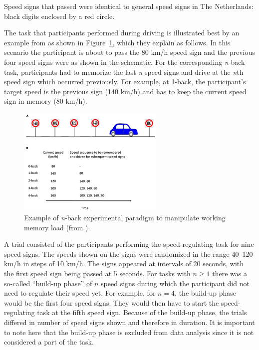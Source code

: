 Speed signs that passed were identical to general speed signs in The Netherlands: black digits enclosed by a red circle. 

The \nback task that participants performed during driving is illustrated best by an example from \citet{Unni2017} as shown in Figure~\ref{fig:nback_scheme}, which they explain as follows.
In this scenario the participant is about to pass the 80 km/h speed sign and the previous four speed signs were as shown in the schematic. 
For the corresponding \textit{n}-back task, participants had to memorize the last \textit{n} speed signs and drive at the \textit{n}th speed sign which occurred previously.
For example, at 1-back, the participant’s target speed is the previous sign (140 km/h) and has to keep the current speed sign in memory (80 km/h).

\renewcommand{\thefigure}{2.3}
\begin{figure}
  \centering
  \includegraphics[width=7cm]{images/nback_Scheunemann.pdf}
  \caption{Example of \textit{n}-back experimental paradigm to manipulate working memory load (from \citealp{Unni2017}).}
  \label{fig:nback_scheme}
\end{figure}

A trial consisted of the participants performing the speed-regulating task for nine speed signs. 
The speeds shown on the signs were randomized in the range 40--120 km/h in steps of 10 km/h.
The signs appeared at intervals of 20 seconds, with the first speed sign being passed at 5 seconds.
For \nback tasks with \(n \geq 1\) there was a so-called ``build-up phase'' of \(n\) speed signs during which the participant did not need to regulate their speed yet. 
For example, for \(n = 4\), the build-up phase would be the first four speed signs. 
They would then have to start the speed-regulating task at the fifth speed sign.
Because of the build-up phase, the \nback trials differed in number of speed signs shown and therefore in duration.
It is important to note here that the build-up phase is excluded from data analysis since it is not considered a part of the \nback task. 

